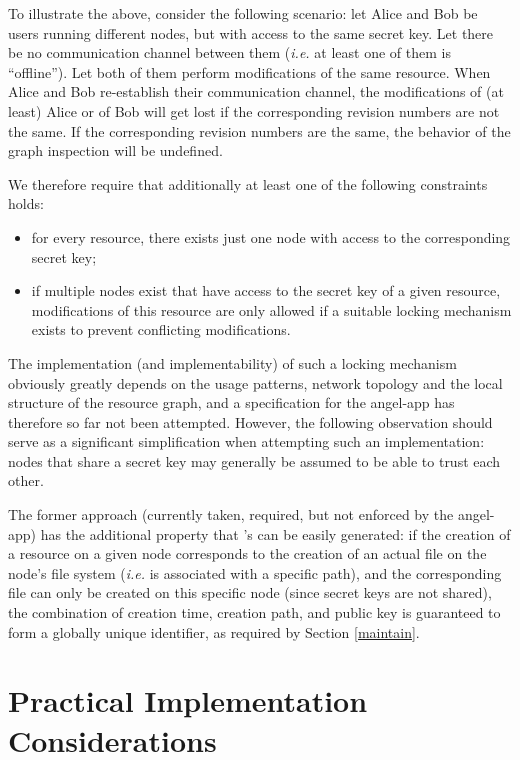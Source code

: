 \documentclass[11pt]{article}
\begin{document}
\begin{mainmatter}
To illustrate the above, consider the following scenario: let Alice and Bob be users running different nodes, but with access to the same secret key. Let there be no communication channel between them (\emph{i.e.} at least one of them is ``offline''). Let both of them perform modifications of the same resource. When Alice and Bob re-establish their communication channel, the modifications of (at least) Alice or of Bob will get lost if the corresponding revision numbers are not the same. If the corresponding revision numbers are the same, the behavior of the graph inspection will be undefined. 

We therefore require that additionally at least one of the following constraints holds:
\begin{itemize}
\item for every resource, there exists just one node with access to the corresponding secret key;
\item if multiple nodes exist that have access to the secret key of a given resource, modifications of this resource are only allowed if a suitable locking mechanism exists to prevent conflicting modifications. 
\end{itemize}
The implementation (and implementability) of such a locking mechanism obviously greatly depends on the usage patterns, network topology and the local structure of the resource graph, and a specification for the angel-app has therefore so far not been attempted. However, the following observation should serve as a significant simplification when attempting such an implementation: nodes that share a secret key may generally be assumed to be able to trust each other.

The former approach (currently taken, required, but not enforced by the angel-app) has the additional property that 's can be easily generated: if the creation of a resource on a given node corresponds to the creation of an actual file on the node's file system (\emph{i.e.} is associated with a specific path), and the corresponding file can only be created on this specific node (since secret keys are not shared), the combination of creation time, creation path, and public key is guaranteed to form a globally unique identifier, as required by Section \ref{maintain}.

\section{Practical Implementation Considerations}


\end{mainmatter}
\end{document}
